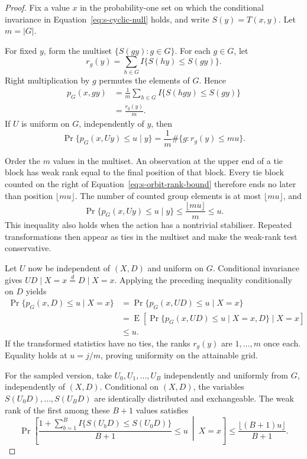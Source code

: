 \documentclass[namedate,webpdf,modern,mediumone]{oup-authoring-template}
\theoremstyle{thmstyleone}
\begin{document}
\begin{proof}
Fix a value $x$ in the probability-one set on which the conditional
invariance in Equation~\eqref{eq:s-cyclic-null} holds, and write
$S(y)=T(x,y)$. Let $m=|G|$.

For fixed $y$, form the multiset $\{S(gy):g\in G\}$. For each $g\in G$, let
\[
 r_g(y)=\sum_{h\in G}I\{S(hy)\leq S(gy)\}.
\]
Right multiplication by $g$ permutes the elements of $G$. Hence
\begin{align*}
 p_G(x,gy)
 &=\frac{1}{m}\sum_{h\in G}I\{S(hgy)\leq S(gy)\} \\
 &=\frac{r_g(y)}{m}.
\end{align*}
If $U$ is uniform on $G$, independently of $y$, then
\begin{equation}
 \Pr\{p_G(x,Uy)\leq u\mid y\}
 =\frac{1}{m}\#\{g:r_g(y)\leq mu\}.
 \label{eq:s-orbit-rank-bound}
\end{equation}

Order the $m$ values in the multiset. An observation at the upper end of a
tie block has weak rank equal to the final position of that block. Every tie
block counted on the right of Equation~\eqref{eq:s-orbit-rank-bound} therefore
ends no later than position $\lfloor mu\rfloor$. The number of counted group
elements is at most $\lfloor mu\rfloor$, and
\[
 \Pr\{p_G(x,Uy)\leq u\mid y\}
 \leq\frac{\lfloor mu\rfloor}{m}\leq u.
\]
This inequality also holds when the action has a nontrivial stabiliser.
Repeated transformations then appear as ties in the multiset and make the
weak-rank test conservative.

Let $U$ now be independent of $(X,D)$ and uniform on $G$. Conditional
invariance gives $UD\mid X=x\overset d=D\mid X=x$. Applying the preceding
inequality conditionally on $D$ yields
\begin{align*}
 \Pr\{p_G(x,D)\leq u\mid X=x\}
 &=\Pr\{p_G(x,UD)\leq u\mid X=x\} \\
 &=\operatorname E\!\left[
   \Pr\{p_G(x,UD)\leq u\mid X=x,D\}\mid X=x\right] \\
 &\leq u.
\end{align*}
If the transformed statistics have no ties, the ranks $r_g(y)$ are
$1,\ldots,m$ once each. Equality holds at $u=j/m$, proving uniformity on the
attainable grid.

For the sampled version, take $U_0,U_1,\ldots,U_B$ independently and uniformly
from $G$, independently of $(X,D)$. Conditional on $(X,D)$, the variables
$S(U_0D),\ldots,S(U_BD)$ are identically distributed and exchangeable. The
weak rank of the first among these $B+1$ values satisfies
\begin{equation}
 \Pr\left[
 \frac{1+\sum_{b=1}^B I\{S(U_bD)\leq S(U_0D)\}}{B+1}
 \leq u\ \middle|\ X=x\right]
 \leq\frac{\lfloor(B+1)u\rfloor}{B+1}.
 \label{eq:s-mc-exchangeable-rank}
\end{equation}


\end{proof}
\end{document}
